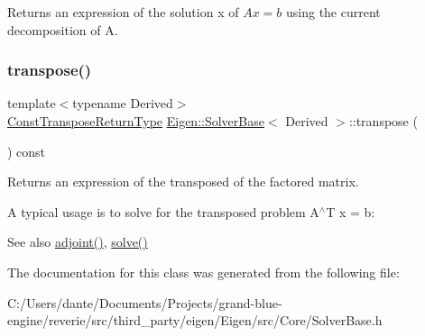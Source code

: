 \begin{DoxyReturn}{Returns}
an expression of the solution x of $ A x = b $ using the current decomposition of A. 
\end{DoxyReturn}
\mbox{\label{class_eigen_1_1_solver_base_a732e75b5132bb4db3775916927b0e86c}} 
\subsubsection{\texorpdfstring{transpose()}{transpose()}}
{\footnotesize\ttfamily template$<$typename Derived$>$ \\
\mbox{\hyperlink{class_eigen_1_1_transpose}{Const\+Transpose\+Return\+Type}} \mbox{\hyperlink{class_eigen_1_1_solver_base}{Eigen\+::\+Solver\+Base}}$<$ Derived $>$\+::transpose (\begin{DoxyParamCaption}{ }\end{DoxyParamCaption}) const\hspace{0.3cm}{\ttfamily [inline]}}

\begin{DoxyReturn}{Returns}
an expression of the transposed of the factored matrix.
\end{DoxyReturn}
A typical usage is to solve for the transposed problem A$^\wedge$T x = b\+: 
\begin{DoxyCode}{0}
\end{DoxyCode}


\begin{DoxySeeAlso}{See also}
\mbox{\hyperlink{class_eigen_1_1_solver_base_a05a3686a89888681c8e0c2bcab6d1ce5}{adjoint()}}, \mbox{\hyperlink{class_eigen_1_1_solver_base_a7fd647d110487799205df6f99547879d}{solve()}} 
\end{DoxySeeAlso}


The documentation for this class was generated from the following file\+:\begin{DoxyCompactItemize}
\item 
C\+:/\+Users/dante/\+Documents/\+Projects/grand-\/blue-\/engine/reverie/src/third\+\_\+party/eigen/\+Eigen/src/\+Core/Solver\+Base.\+h\end{DoxyCompactItemize}

